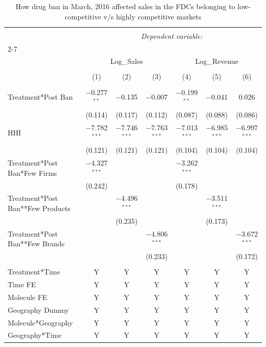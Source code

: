 \documentclass[AER]{AEA}
\theoremstyle{theorem}
\begin{document}
\begin{table}[h!] \centering
	\caption{How drug ban in March, 2016 affected sales in the FDCs belonging to low-competitive v/s highly competitive markets} 
	\label{Table-R-2} 
	\footnotesize
	\begin{tabular}{@{\extracolsep{3pt}}lcccccc} 
		\\[-1.8ex]\hline 
		\hline \\[-1.8ex] 
		& \multicolumn{6}{c}{\textit{Dependent variable:}} \\ 
		\cline{2-7} 
		\\[-1.8ex] & \multicolumn{3}{c}{Log\_Sales} & \multicolumn{3}{c}{Log\_Revenue} \\ 
		\\[-1.8ex] & (1) & (2) & (3) & (4) & (5) & (6)\\ 
		\hline \\[-1.8ex] 
		Treatment*Post Ban & $-$0.277$^{**}$ & $-$0.135 & $-$0.007 & $-$0.199$^{**}$ & $-$0.041 & 0.026 \\ 
		& (0.114) & (0.117) & (0.112) & (0.087) & (0.088) & (0.086) \\ 
		HHI & $-$7.782$^{***}$ & $-$7.746$^{***}$ & $-$7.763$^{***}$ & $-$7.013$^{***}$ & $-$6.985$^{***}$ & $-$6.997$^{***}$ \\ 
		& (0.121) & (0.121) & (0.121) & (0.104) & (0.104) & (0.104) \\ 
		Treatment*Post Ban*Few Firms & $-$4.327$^{***}$ &  &  & $-$3.262$^{***}$ &  &  \\ 
		& (0.242) &  &  & (0.178) &  &  \\ 
		Treatment*Post Ban**Few Products &  & $-$4.496$^{***}$ &  &  & $-$3.511$^{***}$ &  \\ 
		&  & (0.235) &  &  & (0.173) &  \\ 
		Treatment*Post Ban**Few Brands &  &  & $-$4.806$^{***}$ &  &  & $-$3.672$^{***}$ \\ 
		&  &  & (0.233) &  &  & (0.172) \\ 
		\hline \\[-1.8ex] 
		Treatment*Time & Y & Y & Y & Y & Y & Y \\ 
		Time FE & Y & Y & Y & Y & Y & Y \\ 
		Molecule FE & Y & Y & Y & Y & Y & Y \\ 
		Geography Dummy & Y & Y & Y & Y & Y & Y \\ 
		Molecule*Geography & Y & Y & Y & Y & Y & Y \\ 
		Geography*Time & Y & Y & Y & Y & Y & Y \\ 

\end{tabular}
\end{table}
\end{document}
